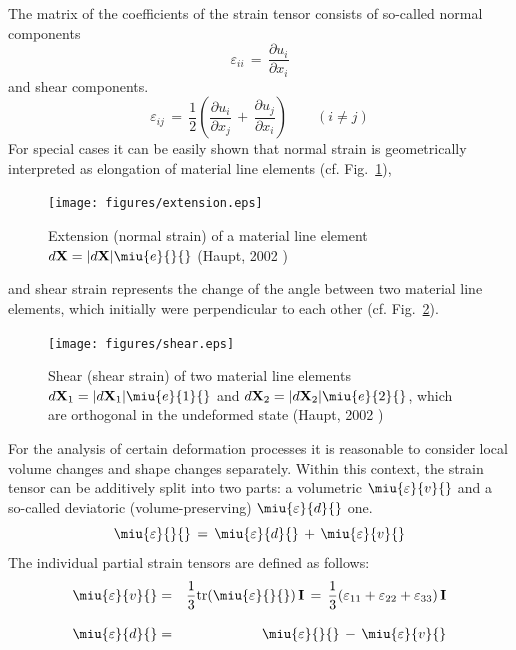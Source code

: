 The matrix of the coefficients of the strain tensor consists of so-called normal components
\begin{equation}
\varepsilon_{ii}\,=\,\frac{\partial u_i}{\partial x_i}
\label{eq:straintensnormal}
\end{equation}
and shear components.
\begin{equation}
\varepsilon_{ij}\,=\,
\frac{1}{2}\left(\frac{\partial u_i}{\partial x_j}\,+\,\frac{\partial u_j}{\partial x_i}\right)
\qquad(i\neq{j})
\label{eq:straintensshear}
\end{equation}
For special cases it can be easily shown that normal strain is geometrically interpreted as elongation of material line elements (cf. Fig.~\ref{fig:extension}),
\begin{figure}[htb!]
\begin{center}
\footnotesize
\texttt{[image: figures/extension.eps]}
\caption{Extension (normal strain) of a material line element $d\mathbf{X}=\vert d\mathbf{X}\vert\miu{e}{}{}$
(Haupt, 2002 \cite{Haupt:2002})}
\label{fig:extension}
\end{center}
\end{figure}

and shear strain represents the change of the angle between two material line elements, which initially were perpendicular to each other (cf. Fig.~\ref{fig:shear}).
\begin{figure}[htb!]
\begin{center}
\footnotesize
\texttt{[image: figures/shear.eps]}
\caption{Shear (shear strain) of two material line elements $d\mathbf{X}_1=\vert d\mathbf{X}_1\vert\miu{e}{1}{}$ and $d\mathbf{X}_2=\vert d\mathbf{X}_2\vert\miu{e}{2}{}$, which are orthogonal in the undeformed state (Haupt, 2002 \cite{Haupt:2002})}
\label{fig:shear}
\end{center}
\end{figure}

For the analysis of certain deformation processes it is reasonable to consider local volume changes and shape changes separately. Within this context, the strain tensor can be additively split into two parts: a volumetric $\miu{\varepsilon}{v}{}$ and a so-called deviatoric (volume-preserving) $\miu{\varepsilon}{d}{}$ one.
\begin{equation}
\miu{\varepsilon}{}{}\,=\,\miu{\varepsilon}{d}{}\,+\,\miu{\varepsilon}{v}{}
\label{eq:strainsplit}
\end{equation}
The individual partial strain tensors are defined as follows:
\begin{eqnarray}
\miu{\varepsilon}{v}{} & = & \frac{1}{3}\mathrm{tr}(\miu{\varepsilon}{}{})\,\mathbf{I}\,=\,
\frac{1}{3}(\varepsilon_{11}+\varepsilon_{22}+\varepsilon_{33})\,\mathbf{I}
\label{eq:devstrain}
 \\[2.0ex]
\miu{\varepsilon}{d}{} & = & \miu{\varepsilon}{}{}\,-\,\miu{\varepsilon}{v}{}
\label{eq:volstrain}
\end{eqnarray}

